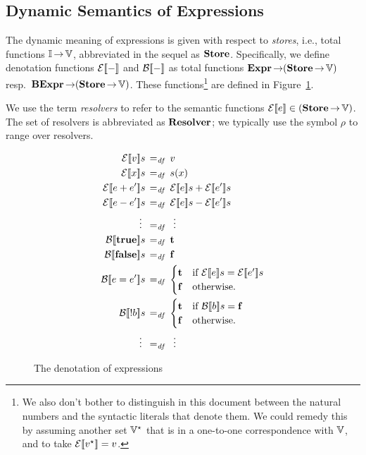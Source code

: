\documentclass[11pt]{report}
\begin{document}


\subsection{Dynamic Semantics of Expressions} %
\label{sub:dynamic_semantics_of_expressions}

The dynamic meaning of expressions is given with respect to \emph{stores}, i.e., total functions $\mathbb{I} \operatorname{\rightarrow} \mathbb{V}$, abbreviated in the sequel as $\mathbf{Store}$. Specifically, we define denotation functions $\mathcal{E}[\![-]\!]$ and $\mathcal{B}[\![-]\!]$ as total functions $\mathbf{Expr} \operatorname{\rightarrow} (\mathbf{Store} \operatorname{\rightarrow} \mathbb{V})$ resp.~$\mathbf{BExpr} \operatorname{\rightarrow} (\mathbf{Store} \operatorname{\rightarrow} \mathbb{V})$. These functions\footnote{We also don't bother to distinguish in this document between the natural numbers and the syntactic literals that denote them. We could remedy this by assuming another set $\mathbb{V}^\star$ that is in a one-to-one correspondence with $\mathbb{V}$, and to take $\mathcal{E}[\![v^\star]\!] = v$.} are defined in Figure~\ref{fig:dnexpr}. 

We use the term \emph{resolvers} to refer to the semantic functions $\mathcal{E}[\![e]\!] \in (\mathbf{Store} \operatorname{\rightarrow} \mathbb{V})$. The set of resolvers is abbreviated as $\mathbf{Resolver}$; we typically use the symbol $\rho$ to range over resolvers. 

\begin{figure}[h]
	\centering
		\begin{align*}
			\dnexpr{v}s & \eqdef v \\
			\dnexpr{x}s & \eqdef s(x) \\
			\dnexpr{e + e'}s & \eqdef \dnexpr{e}s + \dnexpr{e'}s \\
			\dnexpr{e - e'}s & \eqdef \dnexpr{e}s - \dnexpr{e'}s \\
			\vdots~ & \eqdef ~\vdots \\
			\dnbexpr{\bexpt}s & \eqdef \bvt \\
			\dnbexpr{\bexpf}s & \eqdef \bvf \\
			\dnbexpr{e = e'}s & \eqdef \begin{cases}
				\bvt & \text{if $\dnexpr{e}s = \dnexpr{e'}s$} \\
				\bvf & \text{otherwise.}
			\end{cases}\\
			\dnbexpr{!b}s & \eqdef \begin{cases}
				\bvt & \text{if $\dnbexpr{b}s = \bvf$} \\
				\bvf & \text{otherwise.}
			\end{cases}\\
			\vdots~ & \eqdef ~\vdots
		\end{align*}
	\caption{The denotation of expressions}
	\label{fig:dnexpr}
\end{figure}
\end{document}
